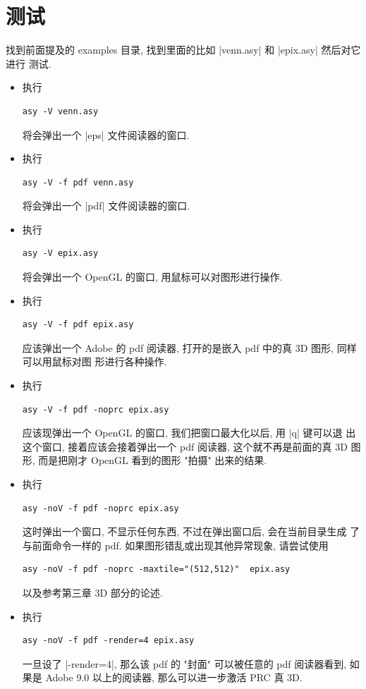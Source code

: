 \documentclass{ctexbook}
\begin{document}
\section{测试}
找到前面提及的 examples 目录, 找到里面的比如 |venn.asy| 和 |epix.asy| 然后对它进行
测试.
\begin{itemize}
\item 执行
\begin{verbatim}
asy -V venn.asy
\end{verbatim}
  将会弹出一个 |eps| 文件阅读器的窗口.
\item 执行
\begin{verbatim}
asy -V -f pdf venn.asy
\end{verbatim}
  将会弹出一个 |pdf| 文件阅读器的窗口.
\item 执行
\begin{verbatim}
asy -V epix.asy
\end{verbatim}
  将会弹出一个 OpenGL 的窗口, 用鼠标可以对图形进行操作.
\item 执行
\begin{verbatim}
asy -V -f pdf epix.asy
\end{verbatim}
  应该弹出一个 Adobe 的 pdf 阅读器, 打开的是嵌入 pdf 中的真 3D 图形, 同样可以用鼠标对图
  形进行各种操作.
\item 执行
\begin{verbatim}
asy -V -f pdf -noprc epix.asy
\end{verbatim}
  应该现弹出一个 OpenGL 的窗口, 我们把窗口最大化以后, 用 |q| 键可以退
  出这个窗口, 接着应该会接着弹出一个 pdf 阅读器, 这个就不再是前面的真
  3D 图形, 而是把刚才 OpenGL 看到的图形 "拍摄" 出来的结果.
\item 执行
\begin{verbatim}
asy -noV -f pdf -noprc epix.asy
\end{verbatim}
  这时弹出一个窗口, 不显示任何东西, 不过在弹出窗口后, 会在当前目录生成
  了与前面命令一样的 pdf. 如果图形错乱或出现其他异常现象, 请尝试使用
\begin{verbatim}
asy -noV -f pdf -noprc -maxtile="(512,512)"  epix.asy
\end{verbatim}
  以及参考第三章 3D 部分的论述.
\item 执行
\begin{verbatim}
asy -noV -f pdf -render=4 epix.asy
\end{verbatim}
  一旦设了 |-render=4|, 那么该 pdf 的 "封面" 可以被任意的 pdf 阅读器看到, 如果是
  Adobe 9.0 以上的阅读器, 那么可以进一步激活 PRC 真 3D.
\end{itemize}
\end{document}
